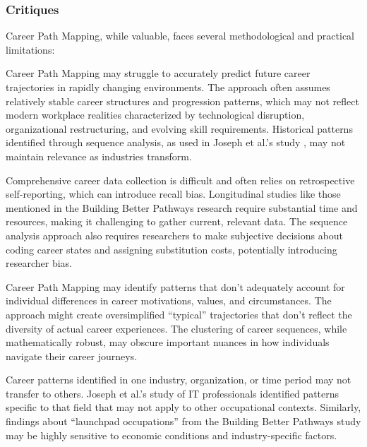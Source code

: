 \documentclass[../main.tex]{subfiles}
\begin{document}
\subsubsection{Critiques}

Career Path Mapping, while valuable, faces several methodological and practical limitations:

Career Path Mapping may struggle to accurately predict future career trajectories in rapidly changing environments. The approach often assumes relatively stable career structures and progression patterns, which may not reflect modern workplace realities characterized by technological disruption, organizational restructuring, and evolving skill requirements. Historical patterns identified through sequence analysis, as used in Joseph et al.'s study \citep{joseph2012}, may not maintain relevance as industries transform.

Comprehensive career data collection is difficult and often relies on retrospective self-reporting, which can introduce recall bias. Longitudinal studies like those mentioned in the Building Better Pathways research \citep{workforcegps2023} require substantial time and resources, making it challenging to gather current, relevant data. The sequence analysis approach also requires researchers to make subjective decisions about coding career states and assigning substitution costs, potentially introducing researcher bias.

Career Path Mapping may identify patterns that don't adequately account for individual differences in career motivations, values, and circumstances. The approach might create oversimplified ``typical'' trajectories that don't reflect the diversity of actual career experiences. The clustering of career sequences, while mathematically robust, may obscure important nuances in how individuals navigate their career journeys.

Career patterns identified in one industry, organization, or time period may not transfer to others. Joseph et al.'s study of IT professionals \citep{joseph2012} identified patterns specific to that field that may not apply to other occupational contexts. Similarly, findings about ``launchpad occupations'' from the Building Better Pathways study \citep{workforcegps2023} may be highly sensitive to economic conditions and industry-specific factors.
\end{document}
